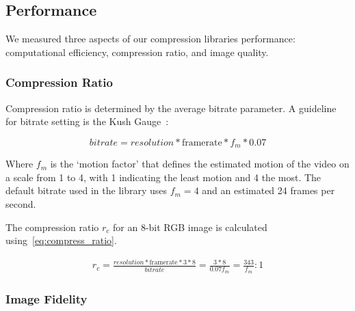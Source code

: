 \documentclass[review]{vgtc}                 %
\begin{document}

\subsection{Performance}

We measured three aspects of our compression libraries performance:
computational efficiency, compression ratio, and image quality.

\subsubsection{Compression Ratio}



Compression ratio is determined by the average bitrate parameter.
A guideline for bitrate setting is the Kush
Gauge~\cite{iszaidyinvestigation}:

\begin{equation}
\label{eq:bitrate}
 bitrate = resolution * \text{framerate} * f_m * 0.07 
\end{equation}

Where \(f_m\) is the `motion factor' that defines the estimated motion
of the video on a scale from 1 to 4, with 1 indicating the least motion
and 4 the most. The default bitrate used in the library uses 
\(f_m=4\) and an estimated 24 frames per second.

The compression ratio \(r_c\) for an 8-bit RGB image is calculated
using~\cref{eq:compress_ratio}.

\begin{multline}
\label{eq:compress_ratio}
 r_c = \frac{ resolution * \text{framerate} * 3 * 8}{ bitrate} = \frac{3*8}{0.07f_m} = \frac{343}{f_m} : 1
\end{multline}

\subsubsection{Image Fidelity}
\end{document}
